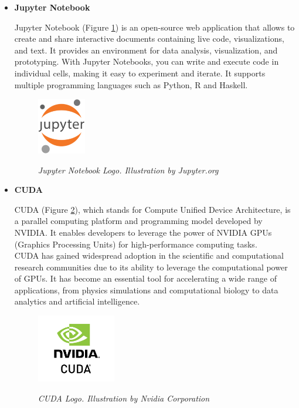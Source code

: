\begin{itemize}
  \item \textbf{Jupyter Notebook}

    Jupyter Notebook (Figure \ref{fig:jupyter-logo}) is an open-source
    web application that allows to create and share interactive documents
    containing live code, visualizations, and text. It provides an environment
    for data analysis, visualization, and prototyping. With Jupyter Notebooks,
    you can write and execute code in individual cells, making it easy to
    experiment and iterate. It supports multiple programming languages such as
    Python, R and Haskell.

    \begin{figure}[H]
      \centering
      \includegraphics[width=0.2\textwidth]{imatges/studies_and_decisions/jupyter-notebook.png}
      \caption[Jupyter Notebook Logo]{\textit{Jupyter Notebook Logo. Illustration by Jupyter.org}}
      {\label{fig:jupyter-logo}}
    \end{figure}

    \newpage

  \item \textbf{CUDA}

    CUDA (Figure \ref{fig:cuda-logo}), which stands for Compute
    Unified Device Architecture, is a parallel computing platform and
    programming model developed by NVIDIA. It enables developers to leverage
    the power of NVIDIA GPUs (Graphics Processing Units) for high-performance
    computing tasks. \\

    CUDA has gained widespread adoption in the scientific and computational
    research communities due to its ability to leverage the computational power
    of GPUs. It has become an essential tool for accelerating a wide range of
    applications, from physics simulations and computational biology to data
    analytics and artificial intelligence.

    \begin{figure}[H]
      \centering
      \begin{adjustbox}{trim=0cm 0.25cm 0cm 0.5cm, clip}
        \includegraphics[width=0.325\textwidth]{imatges/studies_and_decisions/nvidia-cuda.jpg}
      \end{adjustbox}
      \caption[CUDA Logo]{\textit{CUDA Logo. Illustration by Nvidia Corporation}}
      {\label{fig:cuda-logo}}
    \end{figure}


\end{itemize}
